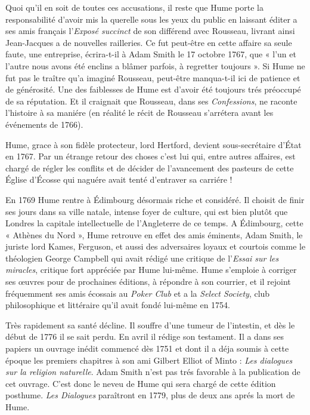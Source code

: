 Quoi qu’il en soit de toutes ces accusations, il
reste que Hume porte la responsabilité d’avoir mis
la querelle sous les yeux du public en laissant éditer
a ses amis français l’{\it Exposé succinct} de son différend
avec Rousseau, livrant ainsi Jean-Jacques a de
nouvelles railleries. Ce fut peut-être en cette affaire
sa seule faute, une entreprise, écrira-t-il à Adam
Smith le 17 octobre 1767, que « l’un et l’autre nous
avons été enclins a blâmer parfois, à regretter
toujours ». Si Hume ne fut pas le traître qu’a imaginé
Rousseau, peut-être manqua-t-il ici de patience et
de générosité. Une des faiblesses de Hume est d’avoir
été toujours trés préoccupé de sa réputation. Et
il craignait que Rousseau, dans ses {\it Confessions}, ne
raconte l'histoire à sa maniére (en réalité le récit de
Rousseau s’arrétera avant les événements de 1766).

Hume, grace à son fidèle protecteur, lord Hertford,
devient sous-secrétaire d’État en 1767. Par un
étrange retour des choses c’est lui qui, entre autres
affaires, est chargé de régler les conflits et de décider
de l’avancement des pasteurs de cette Église
d’Écosse qui naguére avait tenté d’entraver sa
carriére !

En 1769 Hume rentre à Édimbourg désormais
riche et considéré. Il choisit de finir ses jours dans
sa ville natale, intense foyer de culture, qui est bien
plutôt que Londres la capitale intellectuelle de
l’Angleterre de ce temps. A Édimbourg, cette
« Athènes du Nord », Hume retrouve en effet des
amis éminents, Adam Smith, le juriste lord Kames,
Ferguson, et aussi des adversaires loyaux et courtois
comme le théologien George Campbell qui avait
rédigé une critique de l’{\it Essai sur les miracles}, critique
fort appréciée par Hume lui-même. Hume
s’emploie à corriger ses {\oe}uvres pour de prochaines
éditions, à répondre à son courrier, et il rejoint
fréquemment ses amis écossais au {\it Poker Club} et a
la {\it Select Society}, club philosophique et littéraire
qu’il avait fondé lui-même en 1754.

Très rapidement sa santé décline. Il souffre d’une
tumeur de l'intestin, et dès le début de 1776 il se
sait perdu. En avril il rédige son testament. Il a
dans ses papiers un ouvrage inédit commencé
dès 1751 et dont il a déja soumis à cette époque les
premiers chapitres à son ami Gilbert Elliot of Minto :
{\it Les dialogues sur la religion naturelle}. Adam Smith
n'est pas trés favorable à la publication de cet
ouvrage. C’est donc le neveu de Hume qui sera
chargé de cette édition posthume. {\it Les Dialogues}
paraîtront en 1779, plus de deux ans aprés la mort
de Hume.

